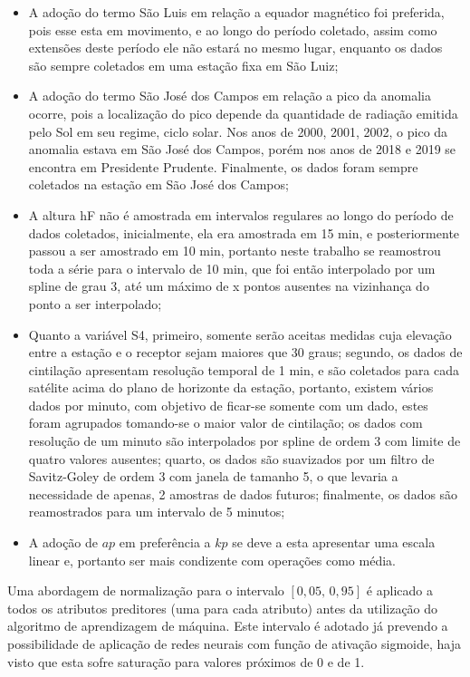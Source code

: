 \begin{itemize}
\item A adoção do termo São Luis em relação a equador magnético foi preferida, pois esse esta em movimento, e ao longo do período coletado, assim como extensões deste período ele não estará no mesmo lugar, enquanto os dados são sempre coletados em uma estação fixa em São Luiz;
\item A adoção do termo São José dos Campos em relação a pico da anomalia ocorre, pois a localização do pico depende da quantidade de radiação emitida pelo Sol em seu regime, ciclo solar. Nos anos de 2000, 2001, 2002, o pico da anomalia estava em São José dos Campos, porém nos anos de 2018 e 2019 se encontra em Presidente Prudente. Finalmente, os dados foram sempre coletados na estação em São José dos Campos;
\item A altura hF não é amostrada em intervalos regulares ao longo do período de dados coletados, inicialmente, ela era amostrada em 15 min, e posteriormente passou a ser amostrado em 10 min, portanto neste trabalho se reamostrou toda a série para o intervalo de 10 min, que foi então interpolado por um spline de grau 3, até um máximo de x pontos ausentes na vizinhança do ponto a ser interpolado;
\item Quanto a variável S4, primeiro, somente serão aceitas medidas cuja elevação entre a estação e o receptor sejam maiores que 30 graus; segundo, os dados de cintilação apresentam resolução temporal de 1 min, e são coletados para cada satélite acima do plano de horizonte da estação, portanto, existem vários dados por minuto, com objetivo de ficar-se somente com um dado, estes foram agrupados tomando-se o maior valor de cintilação; os dados com resolução de um minuto são interpolados por spline de ordem 3 com limite de quatro valores ausentes; quarto, os dados são suavizados por um filtro de Savitz-Goley de ordem 3 com janela de tamanho 5, o que levaria a necessidade de apenas, 2 amostras de dados futuros; finalmente, os dados são reamostrados para um intervalo de 5 minutos;
\item A adoção de $ap$ em preferência a $kp$ se deve a esta apresentar uma escala linear e, portanto ser mais condizente com operações como média.
\end{itemize}

Uma abordagem de normalização para o intervalo $[0,05,\,0,95]$ é aplicado a todos os atributos preditores (uma para cada atributo) antes da utilização do algoritmo de aprendizagem de máquina. Este intervalo é adotado já prevendo a possibilidade de aplicação de redes neurais com função de ativação sigmoide, haja visto que esta sofre saturação para valores próximos de 0 e de 1.

